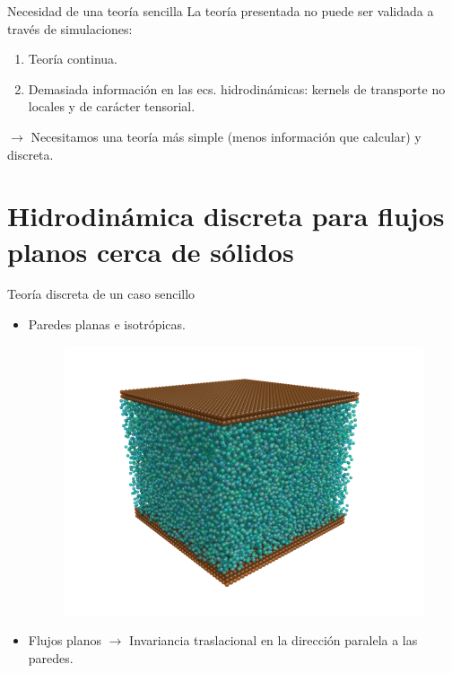 \documentclass{beamer}
\begin{document}
\begin{frame}{Necesidad de una teoría sencilla}
    La teoría presentada no puede ser validada a través de simulaciones:
      \begin{enumerate}
        \item Teoría continua.
        \item Demasiada información en las ecs. hidrodinámicas: kernels de transporte no locales y de carácter tensorial. 
      \end{enumerate}
    $\rightarrow$ Necesitamos una \alert{teoría más simple} (menos información que calcular) y \alert{discreta}. 
\end{frame}

\section{Hidrodinámica discreta para flujos planos cerca de sólidos}

\begin{frame}{Teoría discreta de un caso sencillo}
  \begin{itemize}
    \item<1-> Paredes planas e isotrópicas. 
      \begin{figure}
        \includegraphics[width=.6\linewidth]{PRL3_gold2_wo_layers_wo_diffuse}
      \end{figure}
    \item<2-> Flujos planos $\rightarrow$ Invariancia traslacional en la dirección paralela a las paredes.
  \end{itemize}
\end{frame}
\end{document}
